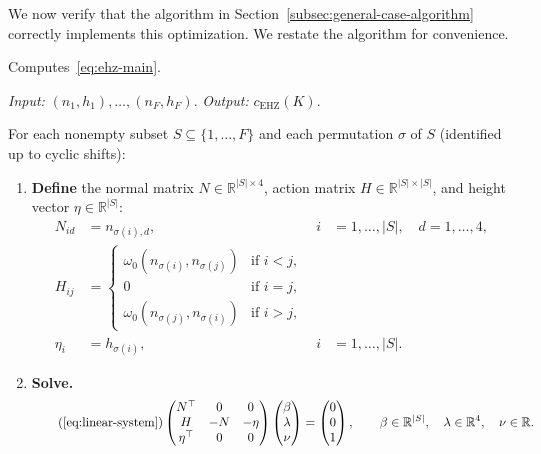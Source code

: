 We now verify that the algorithm in
Section~\ref{subsec:general-case-algorithm} correctly implements this
optimization. We restate the algorithm for convenience.

\begin{algorithm*}
Computes~\eqref{eq:ehz-main}.

\smallskip\noindent
\emph{Input:} $(n_1, h_1), \ldots, (n_F, h_F)$.
\quad
\emph{Output:} $c_{\mathrm{EHZ}}(K)$.

\smallskip\noindent
For each nonempty subset $S \subseteq \{1, \ldots, F\}$
and each permutation $\sigma$ of $S$
(identified up to cyclic shifts):

\begin{enumerate}
\item \textbf{Define}
  the normal matrix $N \in \mathbb{R}^{|S| \times 4}$,
  action matrix $H \in \mathbb{R}^{|S| \times |S|}$,
  and height vector $\eta \in \mathbb{R}^{|S|}$:
  \begin{align*}
    N_{id} &= n_{\sigma(i),d},
      & i &= 1, \ldots, |S|, \quad d = 1, \ldots, 4, \\
    H_{ij} &= \begin{cases}
      \omega_0(n_{\sigma(i)}, n_{\sigma(j)}) & \text{if } i < j, \\
      0 & \text{if } i = j, \\
      \omega_0(n_{\sigma(j)}, n_{\sigma(i)}) & \text{if } i > j,
    \end{cases} \\
    \eta_i &= h_{\sigma(i)},
      & i &= 1, \ldots, |S|.
  \end{align*}

\item \textbf{Solve.}
  \begin{equation}\tag{\ref{eq:linear-system}}
    \begin{pmatrix} N^\top & 0 & 0 \\ H & -N & -\eta \\ \eta^\top & 0 & 0 \end{pmatrix}
    \begin{pmatrix} \beta \\ \lambda \\ \nu \end{pmatrix}
    = \begin{pmatrix} 0 \\ 0 \\ 1 \end{pmatrix},
    \qquad
    \beta \in \mathbb{R}^{|S|}, \quad \lambda \in \mathbb{R}^4, \quad \nu \in \mathbb{R}.
  \end{equation}


\end{enumerate}
\end{algorithm*}
